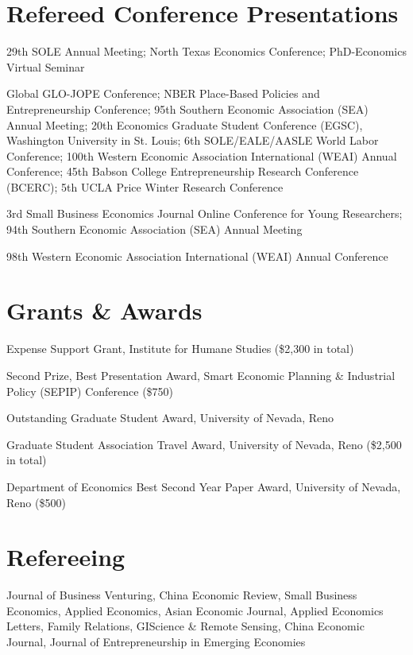 \documentclass[12pt,letterpaper]{report}
\begin{document}
\section*{Refereed Conference Presentations}
{\selectfont
\begin{tablist}
  \item[2026] \tab{}29th SOLE Annual Meeting; North Texas Economics Conference; PhD-Economics Virtual Seminar

  \item[2025] \tab{}Global GLO-JOPE Conference; NBER Place-Based Policies and Entrepreneurship Conference; 95th Southern Economic Association (SEA) Annual Meeting; 20th Economics Graduate Student Conference (EGSC), Washington University in St. Louis; 6th SOLE/EALE/AASLE World Labor Conference; 100th Western Economic Association International (WEAI) Annual Conference; 45th Babson College Entrepreneurship Research Conference (BCERC); 5th UCLA Price Winter Research Conference

  \item[2024] \tab{}3rd Small Business Economics Journal Online Conference for Young Researchers; 94th Southern Economic Association (SEA) Annual Meeting

  \item[2023] \tab{}98th Western Economic Association International (WEAI) Annual Conference
\end{tablist}
}

\section*{Grants \& Awards}
\begin{tablist}[leftmargin=2.8cm,labelwidth=2.5cm,labelsep=0.3cm]
\item[2026, 2025] Expense Support Grant, Institute for Humane Studies (\$2,300 in total)
\item[2025] Second Prize, Best Presentation Award, Smart Economic Planning \& Industrial Policy (SEPIP) Conference (\$750)
\item[2025] Outstanding Graduate Student Award, University of Nevada, Reno
\item[2023--2026] Graduate Student Association Travel Award, University of Nevada, Reno (\$2,500 in total)
\item[2022] Department of Economics Best Second Year Paper Award, University of Nevada, Reno (\$500)
\end{tablist}

\section*{Refereeing}
{\selectfont
\begin{tablist}[leftmargin=0pt,labelwidth=0pt,labelsep=0pt]
  \item[] Journal of Business Venturing, China Economic Review, Small Business Economics, Applied Economics, Asian Economic Journal, Applied Economics Letters, Family Relations, GIScience \& Remote Sensing, China Economic Journal, Journal of Entrepreneurship in Emerging Economies
\end{tablist}
}
\end{document}
